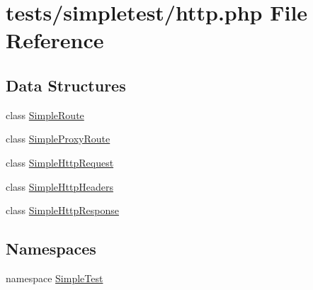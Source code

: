 \hypertarget{http_8php}{\section{tests/simpletest/http.php File Reference}
\label{http_8php}
}
\subsection*{Data Structures}
\begin{DoxyCompactItemize}
\item 
class \hyperlink{class_simple_route}{Simple\-Route}
\item 
class \hyperlink{class_simple_proxy_route}{Simple\-Proxy\-Route}
\item 
class \hyperlink{class_simple_http_request}{Simple\-Http\-Request}
\item 
class \hyperlink{class_simple_http_headers}{Simple\-Http\-Headers}
\item 
class \hyperlink{class_simple_http_response}{Simple\-Http\-Response}
\end{DoxyCompactItemize}
\subsection*{Namespaces}
\begin{DoxyCompactItemize}
\item 
namespace \hyperlink{namespace_simple_test}{Simple\-Test}
\end{DoxyCompactItemize}
